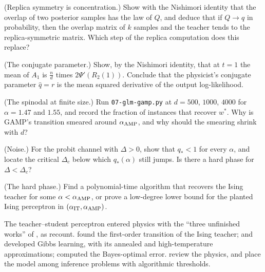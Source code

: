 \begin{refsection}
\begin{exercises}
\item \translate (Replica symmetry is concentration.) Show with the Nishimori identity that the overlap of two posterior samples has the law of $Q$, and deduce that if $Q\to q$ in probability, then the overlap matrix of $k$ samples and the teacher tends to the replica-symmetric matrix. Which step of the replica computation does this replace?\label{ex:glm:rs}

\item \translate (The conjugate parameter.) Show, by the Nishimori identity, that at $t=1$ the mean of $A_1$ is $\frac nd$ times $2\Psi'(R_2(1))$. Conclude that the physicist's conjugate parameter $\hat q=r$ is the mean squared derivative of the output log-likelihood.\label{ex:glm:conjugate}

\item \measurement (The spinodal at finite size.) Run \texttt{07-glm-gamp.py} at $d=500$, $1000$, $4000$ for $\alpha=1.47$ and $1.55$, and record the fraction of instances that recover $w^*$. Why is GAMP's transition smeared around $\alpha_{\mathrm{AMP}}$, and why should the smearing shrink with $d$?\label{ex:glm:spinodal}

\item \research (Noise.) For the probit channel with $\Delta>0$, show that $q_*<1$ for every $\alpha$, and locate the critical $\Delta_c$ below which $q_*(\alpha)$ still jumps. Is there a hard phase for $\Delta<\Delta_c$?\label{ex:glm:noise}

\item \research (The hard phase.) Find a polynomial-time algorithm that recovers the Ising teacher for some $\alpha<\alpha_{\mathrm{AMP}}$, or prove a low-degree lower bound for the planted Ising perceptron in $(\alpha_{\mathrm{IT}},\alpha_{\mathrm{AMP}})$.\label{ex:glm:hard}
\end{exercises}

\notesandrefs
The teacher--student perceptron entered physics with the ``three unfinished works'' of \textcite{GardnerDerrida1989b}, as \textcite{BarbierEtAl2019} recount. \Textcite{Gyorgyi1990} found the first-order transition of the Ising teacher; \textcite{SompolinskyTishbySeung1990} and \textcite{SeungSompolinskyTishby1992} developed Gibbs learning, with its annealed and high-temperature approximations; \textcite{OpperHaussler1991} computed the Bayes-optimal error. \Textcite{EngelVandenBroeck2001} review the physics, and \textcite{ZdeborovaKrzakala2016} place the model among inference problems with algorithmic thresholds.


\end{refsection}
